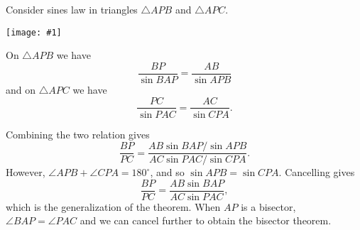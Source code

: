 \documentclass[12pt]{article}
\newcommand{\figuraex}[2]{\begin{center}\texttt{[image: \#1]}\end{center}}
\begin{document}
Consider sines law in triangles $\triangle APB$ and $\triangle APC$. 
\figuraex{genbisector}{scale=0.75}

On $\triangle APB$ we have
\[
\frac{BP}{\sin BAP } = \frac{AB}{\sin APB}
\]
and on $\triangle APC$ we have
\[
\frac{PC}{\sin PAC} = \frac{AC}{\sin CPA}.
\]

Combining the two relation gives
\[
\frac{BP}{PC} = \frac{ AB\sin BAP / \sin APB}{AC\sin PAC / \sin CPA}.
\]
However, $\angle APB + \angle CPA = 180^\circ$, and so $\sin APB = \sin CPA$. Cancelling gives
\[\frac{BP}{PC} = \frac{ AB\sin BAP}{AC\sin PAC },\]
which is the generalization of the theorem. When $AP$ is a bisector, $\angle BAP = \angle PAC$ and we can cancel further to obtain the bisector theorem.
\end{document}
